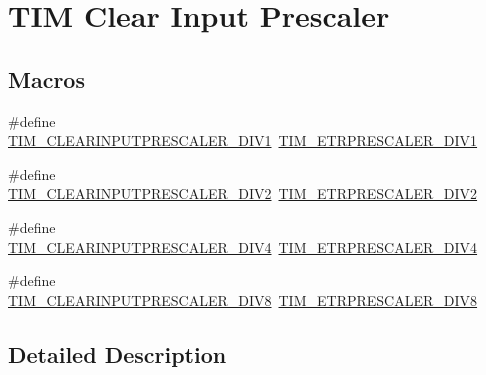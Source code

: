 \hypertarget{group___t_i_m___clear_input___prescaler}{}\section{T\+IM Clear Input Prescaler}
\label{group___t_i_m___clear_input___prescaler}
\subsection*{Macros}
\begin{DoxyCompactItemize}
\item 
\#define \mbox{\hyperlink{group___t_i_m___clear_input___prescaler_gaf88d719dd5535b6b58275549c4512ec7}{T\+I\+M\+\_\+\+C\+L\+E\+A\+R\+I\+N\+P\+U\+T\+P\+R\+E\+S\+C\+A\+L\+E\+R\+\_\+\+D\+I\+V1}}~\mbox{\hyperlink{group___t_i_m___e_t_r___prescaler_gabead5364c62645592e42545ba09ab88a}{T\+I\+M\+\_\+\+E\+T\+R\+P\+R\+E\+S\+C\+A\+L\+E\+R\+\_\+\+D\+I\+V1}}
\item 
\#define \mbox{\hyperlink{group___t_i_m___clear_input___prescaler_gae54b2f4ea04ef97f7c75755347edc8ba}{T\+I\+M\+\_\+\+C\+L\+E\+A\+R\+I\+N\+P\+U\+T\+P\+R\+E\+S\+C\+A\+L\+E\+R\+\_\+\+D\+I\+V2}}~\mbox{\hyperlink{group___t_i_m___e_t_r___prescaler_gaf7fe49f67bdb6b33b9b41953fee75680}{T\+I\+M\+\_\+\+E\+T\+R\+P\+R\+E\+S\+C\+A\+L\+E\+R\+\_\+\+D\+I\+V2}}
\item 
\#define \mbox{\hyperlink{group___t_i_m___clear_input___prescaler_gae3c3dea810bb9d83b532737f01a3213d}{T\+I\+M\+\_\+\+C\+L\+E\+A\+R\+I\+N\+P\+U\+T\+P\+R\+E\+S\+C\+A\+L\+E\+R\+\_\+\+D\+I\+V4}}~\mbox{\hyperlink{group___t_i_m___e_t_r___prescaler_gaa09da30c3cd28f1fe6b6f3f599a5212c}{T\+I\+M\+\_\+\+E\+T\+R\+P\+R\+E\+S\+C\+A\+L\+E\+R\+\_\+\+D\+I\+V4}}
\item 
\#define \mbox{\hyperlink{group___t_i_m___clear_input___prescaler_ga34bc6cb7ee8800cc48b1ee6c536859cc}{T\+I\+M\+\_\+\+C\+L\+E\+A\+R\+I\+N\+P\+U\+T\+P\+R\+E\+S\+C\+A\+L\+E\+R\+\_\+\+D\+I\+V8}}~\mbox{\hyperlink{group___t_i_m___e_t_r___prescaler_ga834e38200874cced108379b17a24d0b7}{T\+I\+M\+\_\+\+E\+T\+R\+P\+R\+E\+S\+C\+A\+L\+E\+R\+\_\+\+D\+I\+V8}}
\end{DoxyCompactItemize}


\subsection{Detailed Description}


